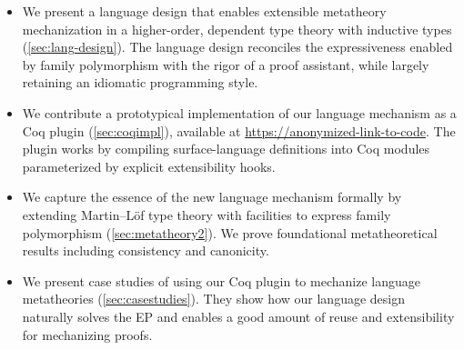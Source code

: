 \begin{itemize}%
    [labelsep=*,leftmargin=1pc,itemsep=3pt]

\item We present a
language design that enables extensible
metatheory mechanization in a higher-order, dependent type theory with
inductive types (\cref{sec:lang-design}).
The language design reconciles the expressiveness enabled by
family polymorphism with the rigor of a proof assistant,
while largely retaining an idiomatic programming style.

\item We contribute a prototypical implementation of our language
mechanism as a Coq plugin (\cref{sec:coqimpl}),
available at \url{https://anonymized-link-to-code}.
The plugin works by
compiling surface-language definitions into Coq modules parameterized by
explicit extensibility hooks.

\item We capture the essence of the new language mechanism formally by extending
Martin–Löf type theory with facilities to express family polymorphism (\cref{sec:metatheory2}).
We prove foundational meta\-theoretical results including consistency
and canonicity.

\item We present case studies of using our Coq plugin to mechanize
language metatheories (\cref{sec:casestudies}).
They show how our language design naturally solves the EP and
enables a good amount of reuse and extensibility
for mechanizing proofs.

\end{itemize}



